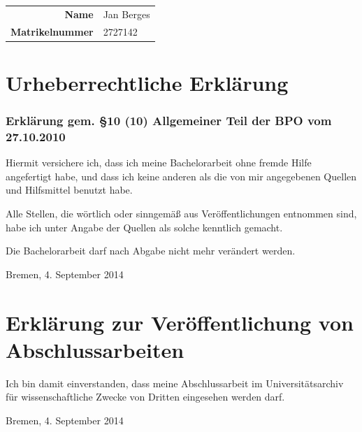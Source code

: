 \documentclass[a4paper, 10pt, twoside, openany]{book} %
\begin{document}
\bigskip

\begin{flushright}
    \begin{tabular}{r l}
        \textbf{Name} & Jan Berges \\
        \textbf{Matrikelnummer} & 2727142
    \end{tabular}
\end{flushright}

\bigskip

\section*{Urheberrechtliche Erklärung}

\subsubsection*{Erklärung gem. \S 10 (10) Allgemeiner Teil der BPO vom 27.10.2010}

Hiermit versichere ich, dass ich meine Bachelorarbeit ohne fremde Hilfe angefertigt habe, und dass ich keine anderen als die von mir angegebenen Quellen und Hilfsmittel benutzt habe.

Alle Stellen, die wörtlich oder sinngemäß aus Veröffentlichungen entnommen sind, habe ich unter Angabe der Quellen als solche kenntlich gemacht.

Die Bachelorarbeit darf nach Abgabe nicht mehr verändert werden.

\vspace{1cm}

\begin{flushright}
    Bremen, 4. September 2014
\end{flushright}

\vspace{1cm}

\section*{Erklärung zur Veröffentlichung von Abschlussarbeiten}

Ich bin damit einverstanden, dass meine Abschlussarbeit im Universitätsarchiv für wissenschaftliche Zwecke von Dritten eingesehen werden darf.

\vspace{1cm}

\begin{flushright}
    Bremen, 4. September 2014
\end{flushright}

\listoffigures


\end{document}
